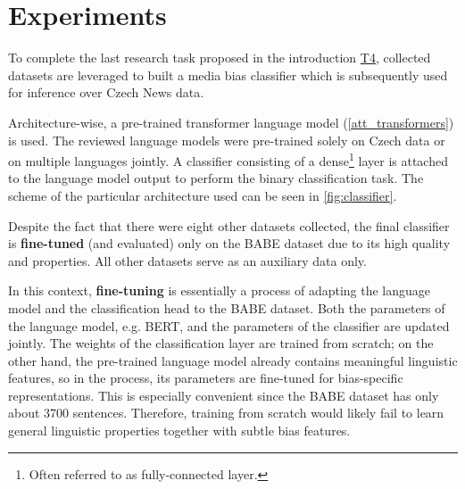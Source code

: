 \chapter{Experiments}\label{experiments}
To complete the last research task proposed in the introduction \hyperref[problem_definition]{T4}, collected datasets are leveraged to built a media bias classifier which is subsequently used for inference over Czech News data. 

Architecture-wise, a pre-trained transformer language model (\ref{att_transformers}) is used. The reviewed language models were pre-trained solely on Czech data or on multiple languages jointly. A classifier consisting of a dense\footnote{Often referred to as fully-connected layer.} layer is attached to the language model output to perform the binary classification task. The scheme of the particular architecture used can be seen in \ref{fig:classifier}.


Despite the fact that there were eight other datasets collected, the final classifier is \textbf{fine-tuned} (and evaluated) only on the BABE dataset due to its high quality and properties. All other datasets serve as an auxiliary data only.

In this context, \textbf{fine-tuning} is essentially a process of adapting the language model and the classification head to the BABE dataset. Both the parameters of the language model, e.g. BERT, and the parameters of the classifier are updated jointly. The weights of the classification layer are trained from scratch; on the other hand, the pre-trained language model already contains meaningful linguistic features, so in the process, its parameters are fine-tuned for bias-specific representations. This is especially convenient since the BABE dataset has only about 3700 sentences. Therefore, training from scratch would likely fail to learn general linguistic properties together with subtle bias features.






\begin{figure}
\end{figure}


